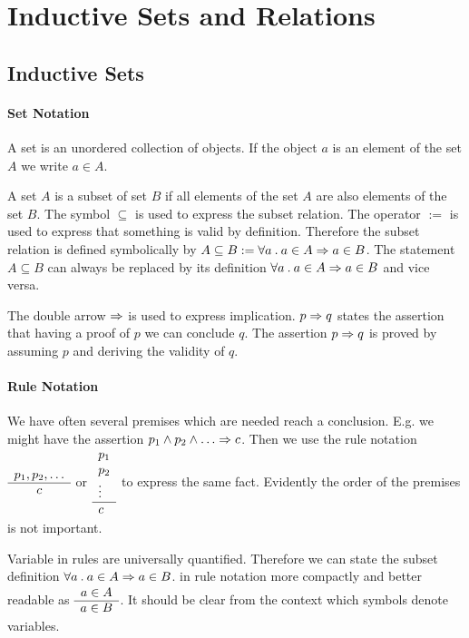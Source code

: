 \section{Inductive Sets and Relations}
\label{setrelation}

\subsection{Inductive Sets}

\paragraph{Set Notation}

A set is an unordered collection of objects. If the object $a$ is an element of the set
$A$ we write $a \in A$.

A set $A$ is a subset of set $B$ if all elements of the set $A$ are also
elements of the set $B$. The symbol $\subseteq$ is used to express the subset
relation. The operator $:=$ is used to express that something is valid by
definition. Therefore the subset relation is defined symbolically by
$A \subseteq B := \forall a\mathbin. a \in A \Rightarrow a \in B$. The statement
$A \subseteq B$ can always be replaced by its definition
$\forall a\mathbin. a \in A \Rightarrow a \in B$ and vice versa.

The double arrow $\Rightarrow$ is used to express implication. $p \Rightarrow q$ states the
assertion that having a proof of $p$ we can conclude $q$. The assertion $p
\Rightarrow q$ is proved by assuming $p$ and deriving the validity of $q$.




\paragraph{Rule Notation}

We have often several premises which are needed reach a conclusion. E.g. we
might have the assertion $p_1 \land p_2 \land \ldots \Rightarrow c$. Then we use the
rule notation $\begin{array}{c} p_1, p_2, \ldots \\ \hline c\end{array}$ or $\begin{array}{l} p_1 \\ p_2\\
  \vdots \\ \hline c\end{array}$ to express the same fact. Evidently the order of the premises is
not important.

Variable in rules are universally quantified. Therefore we can state the
subset definition $\forall a\mathbin. a \in A \Rightarrow a \in B$. in rule notation more
compactly and better readable as $\begin{array}{c} a \in A \\ \hline a \in B\end{array}$. It should be clear
from the context which symbols denote variables.



